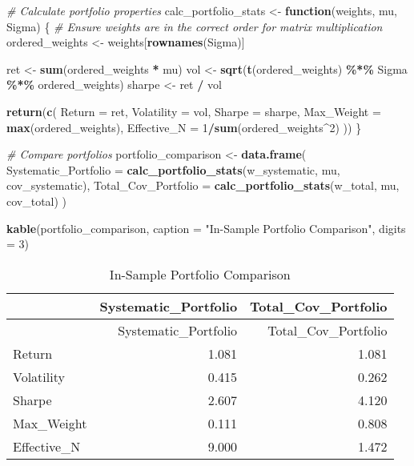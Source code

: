 \documentclass[
]{article}
\newenvironment{Shaded}{\begin{snugshade}}{\end{snugshade}}
\newcommand{\AttributeTok}[1]{\textcolor[rgb]{0.13,0.29,0.53}{#1}}
\newcommand{\CommentTok}[1]{\textcolor[rgb]{0.56,0.35,0.01}{\textit{#1}}}
\newcommand{\ControlFlowTok}[1]{\textcolor[rgb]{0.13,0.29,0.53}{\textbf{#1}}}
\newcommand{\DecValTok}[1]{\textcolor[rgb]{0.00,0.00,0.81}{#1}}
\newcommand{\FunctionTok}[1]{\textcolor[rgb]{0.13,0.29,0.53}{\textbf{#1}}}
\newcommand{\NormalTok}[1]{#1}
\newcommand{\OtherTok}[1]{\textcolor[rgb]{0.56,0.35,0.01}{#1}}
\newcommand{\SpecialCharTok}[1]{\textcolor[rgb]{0.81,0.36,0.00}{\textbf{#1}}}
\newcommand{\StringTok}[1]{\textcolor[rgb]{0.31,0.60,0.02}{#1}}
\begin{document}
\begin{Shaded}
\begin{Highlighting}[]
\CommentTok{\# Calculate portfolio properties}
\NormalTok{calc\_portfolio\_stats }\OtherTok{\textless{}{-}} \ControlFlowTok{function}\NormalTok{(weights, mu, Sigma) \{}
  \CommentTok{\# Ensure weights are in the correct order for matrix multiplication}
\NormalTok{  ordered\_weights }\OtherTok{\textless{}{-}}\NormalTok{ weights[}\FunctionTok{rownames}\NormalTok{(Sigma)]}
  
\NormalTok{  ret }\OtherTok{\textless{}{-}} \FunctionTok{sum}\NormalTok{(ordered\_weights }\SpecialCharTok{*}\NormalTok{ mu)}
\NormalTok{  vol }\OtherTok{\textless{}{-}} \FunctionTok{sqrt}\NormalTok{(}\FunctionTok{t}\NormalTok{(ordered\_weights) }\SpecialCharTok{\%*\%}\NormalTok{ Sigma }\SpecialCharTok{\%*\%}\NormalTok{ ordered\_weights)}
\NormalTok{  sharpe }\OtherTok{\textless{}{-}}\NormalTok{ ret }\SpecialCharTok{/}\NormalTok{ vol}
  
  \FunctionTok{return}\NormalTok{(}\FunctionTok{c}\NormalTok{(}
    \AttributeTok{Return =}\NormalTok{ ret,}
    \AttributeTok{Volatility =}\NormalTok{ vol,}
    \AttributeTok{Sharpe =}\NormalTok{ sharpe,}
    \AttributeTok{Max\_Weight =} \FunctionTok{max}\NormalTok{(ordered\_weights),}
    \AttributeTok{Effective\_N =} \DecValTok{1}\SpecialCharTok{/}\FunctionTok{sum}\NormalTok{(ordered\_weights}\SpecialCharTok{\^{}}\DecValTok{2}\NormalTok{)}
\NormalTok{  ))}
\NormalTok{\}}

\CommentTok{\# Compare portfolios}
\NormalTok{portfolio\_comparison }\OtherTok{\textless{}{-}} \FunctionTok{data.frame}\NormalTok{(}
  \AttributeTok{Systematic\_Portfolio =} \FunctionTok{calc\_portfolio\_stats}\NormalTok{(w\_systematic, mu, cov\_systematic),}
  \AttributeTok{Total\_Cov\_Portfolio =} \FunctionTok{calc\_portfolio\_stats}\NormalTok{(w\_total, mu, cov\_total)}
\NormalTok{)}

\FunctionTok{kable}\NormalTok{(portfolio\_comparison, }\AttributeTok{caption =} \StringTok{"In{-}Sample Portfolio Comparison"}\NormalTok{, }\AttributeTok{digits =} \DecValTok{3}\NormalTok{)}
\end{Highlighting}
\end{Shaded}

\begin{longtable}[]{@{}lrr@{}}
\caption{In-Sample Portfolio Comparison}\tabularnewline
\toprule\noalign{}
& Systematic\_Portfolio & Total\_Cov\_Portfolio \\
\midrule\noalign{}
\endfirsthead
\toprule\noalign{}
& Systematic\_Portfolio & Total\_Cov\_Portfolio \\
\midrule\noalign{}
\endhead
\bottomrule\noalign{}
\endlastfoot
Return & 1.081 & 1.081 \\
Volatility & 0.415 & 0.262 \\
Sharpe & 2.607 & 4.120 \\
Max\_Weight & 0.111 & 0.808 \\
Effective\_N & 9.000 & 1.472 \\
\end{longtable}
\end{document}
